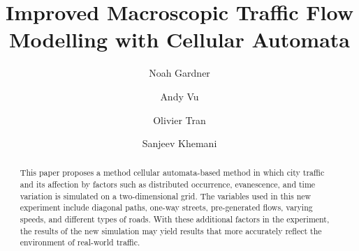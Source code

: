 \documentclass[sigplan,screen]{acmart}
\begin{document}
\title{Improved Macroscopic Traffic Flow Modelling with Cellular Automata}

\author{Noah Gardner}

\author{Andy Vu}
\authornotemark[1]

\author{Olivier Tran}
\authornotemark[1]

\author{Sanjeev Khemani}
\authornotemark[1]

\renewcommand{\shortauthors}{Gardner et al.}

\begin{abstract}
    This paper proposes a method cellular automata-based method in which city
    traffic and its affection by factors such as distributed occurrence,
    evanescence, and time variation is simulated on a two-dimensional grid. The
    variables used in this new experiment include diagonal paths, one-way
    streets, pre-generated flows, varying speeds, and different types of roads.
    With these additional factors in the experiment, the results of the new
    simulation may yield results that more accurately reflect the environment of
    real-world traffic.
\end{abstract}
\end{document}
